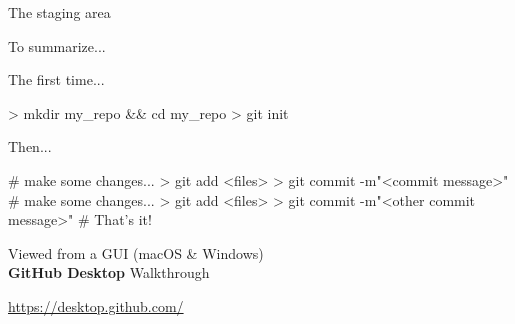 \documentclass[compress]{beamer}
\begin{document}
\begin{frame}{The staging area}
{




    }
\end{frame}

\begin{frame}[fragile]{To summarize...}

The first time...
\begin{shcode}
> mkdir my_repo && cd my_repo
> git init
\end{shcode}
Then...
\begin{shcode}
# make some changes...
> git add <files>
> git commit -m"<commit message>"
# make some changes...
> git add <files>
> git commit -m"<other commit message>"
# That's it!
\end{shcode}


\end{frame}


\begin{frame}{}
    \centering
    Viewed from a GUI (macOS \& Windows)\\
    {\bf GitHub Desktop} Walkthrough\par
    \vspace{3em}
    \url{https://desktop.github.com/}
\end{frame}
\end{document}
